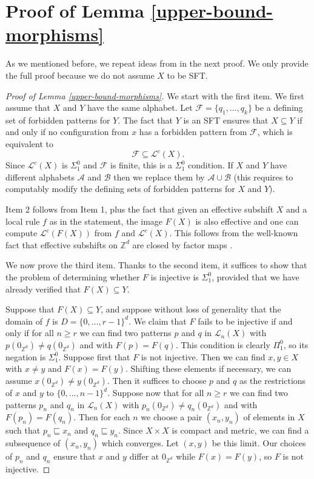 \documentclass[a4paper]{article}
\newcommand{\Le}{\mathcal{L}}
\newcommand{\coLe}{\mathcal{L}^c}
\newcommand{\Z}{\mathbb{Z}}
\newcommand{\A}{\mathcal{A}}
\newcommand{\B}{\mathcal{B}}
\theoremstyle{definition}
\begin{document}
\section{Proof of Lemma \ref{upper-bound-morphisms}}

As we mentioned before, we repeat ideas from \cite{jeandel_hardness_2015} in the next proof. We only provide the full proof because we do not assume $X$ to be SFT. 
\begin{proof}[Proof of Lemma \ref{upper-bound-morphisms}]
We start with the first item. We first assume that $X$ and $Y$ have the same alphabet. Let $\mathcal F=\{q_1,\dots,q_k\}$ be a defining set of forbidden patterns for $Y$. The fact that $Y$ is an SFT ensures that $X\subseteq Y$ if and only if no configuration from $x$ has a forbidden pattern from $\mathcal F$, which is equivalent to 
\[\mathcal F\subseteq \coLe(X).\]
Since $\coLe(X)$ is $\Sigma_1^0$ and $\mathcal F$ is finite, this is a $\Sigma_1^0$ condition. If $X$ and $Y$ have different alphabets $\A$ and $\B$ then we replace them by $\A\cup\B$ (this requires to computably modify the defining sets of forbidden patterns for $X$ and $Y$).  

Item 2 follows from Item 1, plus the fact that given an effective subshift $X$ and a local rule $f$ as in the statement, the image $F(X)$ is also effective and one can compute $\coLe(F(X))$ from $f$ and $\coLe(X)$. This follows from the well-known fact that effective subshifts on $\Z^d$ are closed by factor maps \cite[Proposition 2.7]{aubrun_notion_2017}.

We now prove the third item. Thanks to the second item, it suffices to show that the problem of determining whether $F$ is injective is $\Sigma_1^0$, provided that we have already verified that $F(X)\subseteq Y$. 

Suppose that $F(X)\subseteq Y$, and suppose without loss of generality that the domain of $f$ is $D=\{0,\dots,r-1\}^d$. We claim that $F$ fails to be  injective if and only if for all $n\geq r$ we can find two patterns $p$ and $q$ in $\Le_n(X)$ with $p(0_{\Z^d})\ne q(0_{\Z^d})$ and with $F(p)=F(q)$. This condition is clearly $\Pi_1^0$, so its negation is $\Sigma_1^0$. Suppose first that $F$ is not injective. Then we can find $x,y\in X$ with $x\ne y$ and  $F(x)=F(y)$. Shifting these elements if necessary, we can assume $x(0_{\Z^d})\ne y(0_{\Z^d})$. Then it suffices to choose $p$ and $q$ as the restrictions of $x$ and $y$ to $\{0,\dots,n-1\}^d$. Suppose now that for all $n\geq r$ we can find two patterns $p_n$ and $q_n$ in $\Le_n(X)$ with $p_n(0_{\Z^d})\ne q_n(0_{\Z^d})$ and with $F(p_n)=F(q_n)$. Then for each $n$ we choose a pair $(x_n,y_n)$ of elements in $X$ such that $p_n\sqsubseteq x_n$ and $q_n\sqsubseteq y_n$. Since $X\times X$ is compact and metric, we can find a subsequence of  $(x_n,y_n)$ which converges. Let $(x,y)$ be this limit. Our choices of $p_n$ and $q_n$ ensure that $x$ and $y$ differ at $0_{\Z^d}$ while $F(x)=F(y)$, so $F$ is not injective.
\end{proof}
\end{document}

